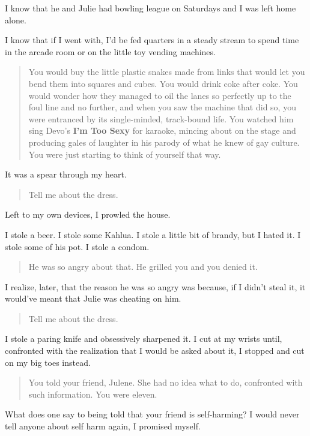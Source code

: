 I know that he and Julie had bowling league on Saturdays and I was left home alone.

I know that if I went with, I'd be fed quarters in a steady stream to spend time in the arcade room or on the little toy vending machines.

\begin{quote}
You would buy the little plastic snakes made from links that would let you bend them into squares and cubes. You would drink coke after coke. You would wonder how they managed to oil the lanes so perfectly up to the foul line and no further, and when you saw the machine that did so, you were entranced by its single-minded, track-bound life. You watched him sing Devo's \textbf{I'm Too Sexy} for karaoke, mincing about on the stage and producing gales of laughter in his parody of what he knew of gay culture. You were just starting to think of yourself that way.
\end{quote}

It was a spear through my heart.

\begin{quote}
Tell me about the dress.
\end{quote}

Left to my own devices, I prowled the house.

I stole a beer. I stole some Kahlua. I stole a little bit of brandy, but I hated it. I stole some of his pot. I stole a condom.

\begin{quote}
He was so angry about that. He grilled you and you denied it.
\end{quote}

I realize, later, that the reason he was so angry was because, if I didn't steal it, it would've meant that Julie was cheating on him.

\begin{quote}
Tell me about the dress.
\end{quote}

I stole a paring knife and obsessively sharpened it. I cut at my wrists until, confronted with the realization that I would be asked about it, I stopped and cut on my big toes instead.

\begin{quote}
You told your friend, Julene. She had no idea what to do, confronted with such information. You were eleven.
\end{quote}

What does one say to being told that your friend is self-harming? I would never tell anyone about self harm again, I promised myself.

